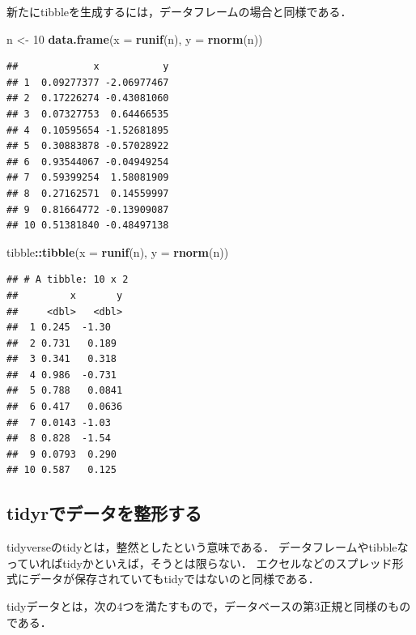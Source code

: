 \documentclass[
]{article}
\newenvironment{Shaded}{\begin{snugshade}}{\end{snugshade}}
\newcommand{\AttributeTok}[1]{\textcolor[rgb]{0.13,0.29,0.53}{#1}}
\newcommand{\DecValTok}[1]{\textcolor[rgb]{0.00,0.00,0.81}{#1}}
\newcommand{\FunctionTok}[1]{\textcolor[rgb]{0.13,0.29,0.53}{\textbf{#1}}}
\newcommand{\NormalTok}[1]{#1}
\newcommand{\OtherTok}[1]{\textcolor[rgb]{0.56,0.35,0.01}{#1}}
\newcommand{\SpecialCharTok}[1]{\textcolor[rgb]{0.81,0.36,0.00}{\textbf{#1}}}
\begin{document}
新たにtibbleを生成するには，データフレームの場合と同様である．

\begin{Shaded}
\begin{Highlighting}[]
\NormalTok{n }\OtherTok{\textless{}{-}} \DecValTok{10}
\FunctionTok{data.frame}\NormalTok{(}\AttributeTok{x =} \FunctionTok{runif}\NormalTok{(n), }\AttributeTok{y =} \FunctionTok{rnorm}\NormalTok{(n))}
\end{Highlighting}
\end{Shaded}

\begin{verbatim}
##             x           y
## 1  0.09277377 -2.06977467
## 2  0.17226274 -0.43081060
## 3  0.07327753  0.64466535
## 4  0.10595654 -1.52681895
## 5  0.30883878 -0.57028922
## 6  0.93544067 -0.04949254
## 7  0.59399254  1.58081909
## 8  0.27162571  0.14559997
## 9  0.81664772 -0.13909087
## 10 0.51381840 -0.48497138
\end{verbatim}

\begin{Shaded}
\begin{Highlighting}[]
\NormalTok{tibble}\SpecialCharTok{::}\FunctionTok{tibble}\NormalTok{(}\AttributeTok{x =} \FunctionTok{runif}\NormalTok{(n), }\AttributeTok{y =} \FunctionTok{rnorm}\NormalTok{(n))}
\end{Highlighting}
\end{Shaded}

\begin{verbatim}
## # A tibble: 10 x 2
##         x       y
##     <dbl>   <dbl>
##  1 0.245  -1.30  
##  2 0.731   0.189 
##  3 0.341   0.318 
##  4 0.986  -0.731 
##  5 0.788   0.0841
##  6 0.417   0.0636
##  7 0.0143 -1.03  
##  8 0.828  -1.54  
##  9 0.0793  0.290 
## 10 0.587   0.125
\end{verbatim}

\hypertarget{tidyrux3067ux30c7ux30fcux30bfux3092ux6574ux5f62ux3059ux308b}{%
\subsection{tidyrでデータを整形する}\label{tidyrux3067ux30c7ux30fcux30bfux3092ux6574ux5f62ux3059ux308b}}

tidyverseのtidyとは，整然としたという意味である．
データフレームやtibbleなっていればtidyかといえば，そうとは限らない．
エクセルなどのスプレッド形式にデータが保存されていてもtidyではないのと同様である．

tidyデータとは，次の4つを満たすもので，データベースの第3正規と同様のものである．
\end{document}
